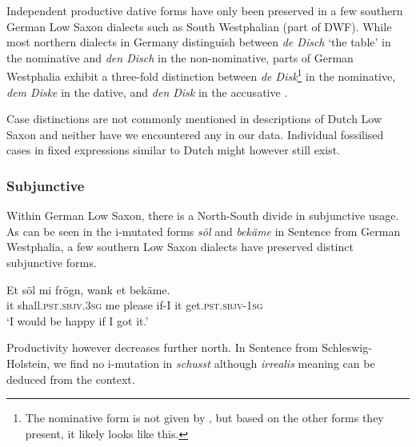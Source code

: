 \documentclass[output=paper,colorlinks,citecolor=brown]{langscibook}
\begin{document}
Independent productive dative forms have only been preserved in a few southern German Low Saxon dialects such as South Westphalian (part of DWF). While most northern dialects in Germany distinguish between \textit{de Disch} `the table' in the nominative and \textit{den Disch} in the non-nominative, parts of German Westphalia exhibit a three-fold distinction between \textit{de Disk}\footnote{The nominative form is not given by \citet[145]{LindowEtAl1998}, but based on the other forms they present, it likely looks like this.} in the nominative, \textit{dem Diske} in the dative, and \textit{den Disk} in the accusative \citep[144--145]{LindowEtAl1998}. 

Case distinctions are not commonly mentioned in descriptions of Dutch Low Saxon and neither have we encountered any in our data. Individual fossilised cases in fixed expressions similar to Dutch might however still exist. 

\subsubsection{Subjunctive}\label{feature:subjunctive}

Within German Low Saxon, there is a North-South divide in subjunctive usage. As can be seen in the i-mutated forms \textit{söl} and \textit{bekäme} in Sentence  from German Westphalia, a few southern Low Saxon dialects have preserved distinct subjunctive forms. 

\ea\label{subjunctive-westphalian}
\gll Et   söl   mi    frögn,   wank   et   bekäme.\\
     it          shall.\textsc{pst}.\textsc{sbjv}.\textsc{3sg}  me    please  if-I   it get.\textsc{pst}.\textsc{sbjv}-\textsc{1sg}\\
\glt `I would be happy if I got it.'
\citep[299]{Saltveit1983} 
\z

Productivity however decreases further north. In Sentence  from Schleswig-Holstein, we find no i-mutation in \textit{schusst} although \textit{irrealis} meaning can be deduced from the context. 
\end{document}
